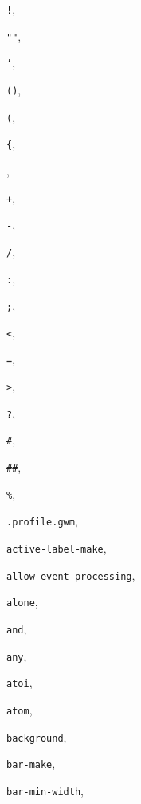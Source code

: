 
\begin{theindex}
\addtocounter{chapter}{1}

\item {\tt !}, {\bf\pageref{!}}
\item {\tt ""}, {\bf\pageref{""}}
\item {\tt '}, {\bf\pageref{'}}
\item {\tt ()}, {\bf\pageref{()}}
\item {\tt (}, {\bf\pageref{(}}
\item {\tt \{}, {\bf\pageref{progn}}
\item {\tt *}, {\bf\pageref{*}}
\item {\tt +}, {\bf\pageref{+}}
\item {\tt -}, {\bf\pageref{-}}
\item {\tt /}, {\bf\pageref{/}}
\item {\tt :}, {\bf\pageref{:}}
\item {\tt ;}, {\bf\pageref{;}}
\item {\tt <}, {\bf\pageref{<}}
\item {\tt =}, {\bf\pageref{=}}
\item {\tt >}, {\bf\pageref{>}}
\item {\tt ?}, {\bf\pageref{?}}
\item {\tt \#}, {\bf\pageref{nth}}
\item {\tt \#\#}, {\bf\pageref{replace-nth}}
\item {\tt \%}, {\bf\pageref{*}}
\item {\tt .profile.gwm}, {\bf\pageref{standard-profile}}
\item {\tt active-label-make}, {\bf\pageref{active-label-make}}
\item {\tt allow-event-processing}, {\bf\pageref{allow-event-processing}}
\item {\tt alone}, {\bf\pageref{alone}}
\item {\tt and}, {\bf\pageref{and}}
\item {\tt any}, {\bf\pageref{any}}
\item {\tt atoi}, {\bf\pageref{atoi}}
\item {\tt atom}, {\bf\pageref{atom}}
\item {\tt background}, {\bf\pageref{background}}
\item {\tt bar-make}, {\bf\pageref{bar-make}}
\item {\tt bar-min-width}, {\bf\pageref{bar-min-width}}

\end{theindex}
